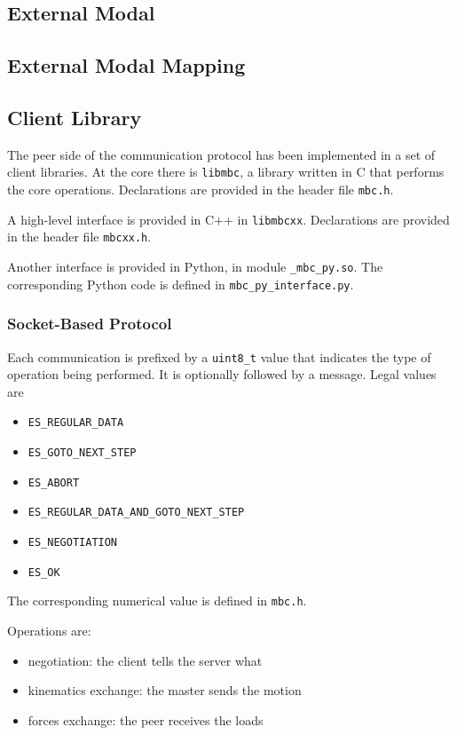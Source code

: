 \subsection{External Modal}

\subsection{External Modal Mapping}

\subsection{Client Library}

The peer side of the communication protocol has been implemented
in a set of client libraries.
At the core there is \texttt{libmbc}, a library written in C
that performs the core operations.
Declarations are provided in the header file \texttt{mbc.h}.

A high-level interface is provided in C++ in \texttt{libmbcxx}.
Declarations are provided in the header file \texttt{mbcxx.h}.

Another interface is provided in Python, in module \texttt{\_mbc\_py.so}.
The corresponding Python code is defined in \texttt{mbc\_py\_interface.py}.

\subsubsection{Socket-Based Protocol}
Each communication is prefixed by a \texttt{uint8\_t} value
that indicates the type of operation being performed.
It is optionally followed by a message.
Legal values are
\begin{itemize}
\item \texttt{ES\_REGULAR\_DATA}
\item \texttt{ES\_GOTO\_NEXT\_STEP}
\item \texttt{ES\_ABORT}
\item \texttt{ES\_REGULAR\_DATA\_AND\_GOTO\_NEXT\_STEP}
\item \texttt{ES\_NEGOTIATION}
\item \texttt{ES\_OK}
\end{itemize}
The corresponding numerical value is defined in \texttt{mbc.h}.

Operations are:
\begin{itemize}
\item negotiation: the client tells the server what
\item kinematics exchange: the master sends the motion
\item forces exchange: the peer receives the loads
\end{itemize}

